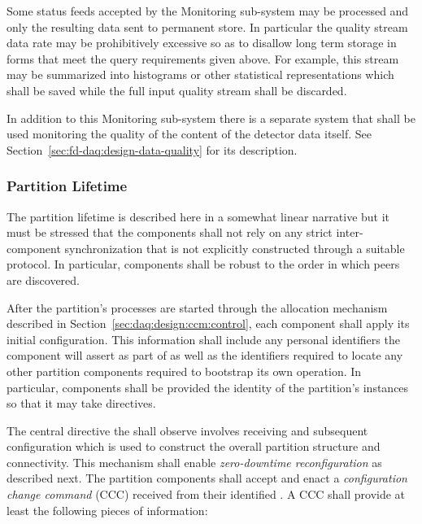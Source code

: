 Some status feeds accepted by the Monitoring sub-system may be processed and only the resulting data sent to permanent store. 
In particular the quality stream data rate may be prohibitively excessive so as to disallow long term storage in forms that meet the query requirements given above. 
For example, this stream may be summarized into histograms or other statistical representations which shall be saved while the full input quality stream shall be discarded.

In addition to this   Monitoring sub-system there is a separate system that shall be used monitoring the quality of the content of the detector data itself.  See Section~\ref{sec:fd-daq:design-data-quality} for its description.

\subsubsection{Partition Lifetime}
\label{sec:daq:partition-lifetime}

The partition lifetime is described here in a somewhat linear narrative but it must be stressed that the components shall not rely on any strict inter-component synchronization that is not explicitly constructed through a suitable protocol. 
In particular, components shall be robust to the order in which peers are discovered.

After the partition's processes are started through the allocation mechanism described in Section~\ref{sec:daq:design:ccm:control}, each component shall apply its initial configuration. 
This information shall include any personal identifiers the component will assert as part of  as well as the identifiers required to locate any other partition components required to bootstrap its own operation. 
In particular, components shall be provided the identity of the partition's  instances so that it may take directives.

The central directive the shall observe involves receiving and subsequent configuration which is used to construct the overall partition structure and connectivity.  
This mechanism shall enable \textit{zero-downtime reconfiguration} as described next.
The partition components shall accept and enact a \textit{configuration change command} (CCC) received from their identified . 
A CCC shall provide at least the following pieces of information:

